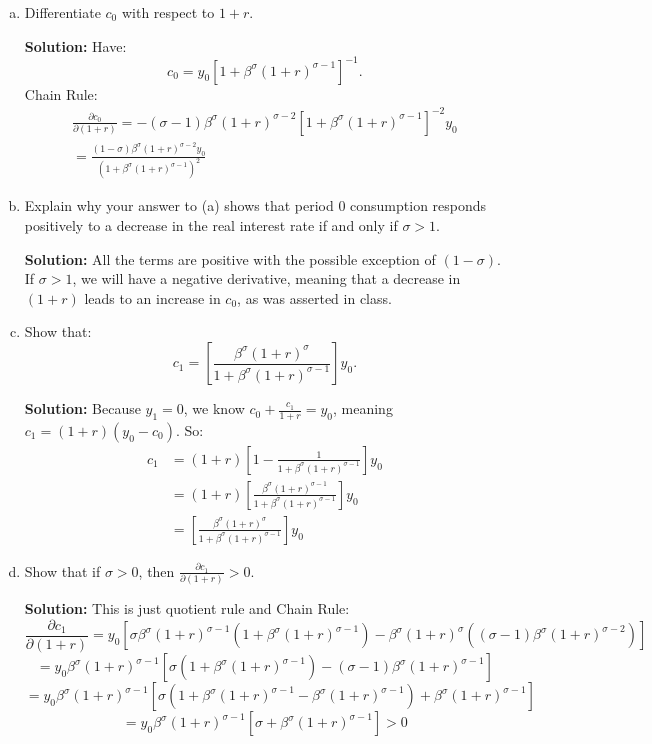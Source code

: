 \documentclass[11pt]{extarticle}
\theoremstyle{plain}
\theoremstyle{definition}
\begin{document}
\begin{enumerate}[(a)]

\item Differentiate $c_0$ with respect to $1+r$.


\textbf{Solution:} Have:
$$
c_0=y_0\left[1+\beta^\sigma(1+r)^{\sigma-1}\right]^{-1} .
$$
Chain Rule:
$$
\begin{array}{r}
\frac{\partial c_0}{\partial(1+r)}=-(\sigma-1) \beta^\sigma(1+r)^{\sigma-2}\left[1+\beta^\sigma(1+r)^{\sigma-1}\right]^{-2} y_0 \\
=\frac{(1-\sigma) \beta^\sigma(1+r)^{\sigma-2} y_0}{\left(1+\beta^\sigma(1+r)^{\sigma-1}\right)^2}
\end{array}
$$


\item Explain why your answer to (a) shows that period 0 consumption responds positively to a decrease in the real interest rate if and only if $\sigma>1$. 

\textbf{Solution:} All the terms are positive with the possible exception of $(1-\sigma)$. If $\sigma>1$, we will have a negative derivative, meaning that a decrease in $(1+r)$ leads to an increase in $c_0$, as was asserted in class.


\item  Show that:
$$
c_1=\left[\frac{\beta^\sigma(1+r)^\sigma}{1+\beta^\sigma(1+r)^{\sigma-1}}\right] y_0 .
$$


\textbf{Solution:} Because $y_1=0$, we know $c_0+\frac{c_1}{1+r}=y_0$, meaning $c_1=(1+r)\left(y_0-c_0\right)$. So:
$$
\begin{aligned}
c_1 &=(1+r)\left[1-\frac{1}{1+\beta^\sigma(1+r)^{\sigma-1}}\right] y_0 \\
&=(1+r)\left[\frac{\beta^\sigma(1+r)^{\sigma-1}}{1+\beta^\sigma(1+r)^{\sigma-1}}\right] y_0 \\
&=\left[\frac{\beta^\sigma(1+r)^\sigma}{1+\beta^\sigma(1+r)^{\sigma-1}}\right] y_0
\end{aligned}
$$

\item Show that if $\sigma>0$, then $\frac{\partial c_1}{\partial(1+r)}>0$.

\textbf{Solution:} This is just quotient rule and Chain Rule:
$$\frac{\partial c_1}{\partial(1+r)}=y_0\left[\sigma \beta^\sigma(1+r)^{\sigma-1}\left(1+\beta^\sigma(1+r)^{\sigma-1}\right)-\beta^\sigma(1+r)^\sigma\left((\sigma-1) \beta^\sigma(1+r)^{\sigma-2}\right)\right]$$
$$=y_0 \beta^\sigma(1+r)^{\sigma-1}\left[\sigma\left(1+\beta^\sigma(1+r)^{\sigma-1}\right)-(\sigma-1) \beta^\sigma(1+r)^{\sigma-1}\right]$$
$$=y_0 \beta^\sigma(1+r)^{\sigma-1}\left[\sigma\left(1+\beta^\sigma(1+r)^{\sigma-1}-\beta^\sigma(1+r)^{\sigma-1}\right)+\beta^\sigma(1+r)^{\sigma-1}\right]$$
$$=y_0 \beta^\sigma(1+r)^{\sigma-1}\left[\sigma+\beta^\sigma(1+r)^{\sigma-1}\right]>0$$


\end{enumerate}
\end{document}
